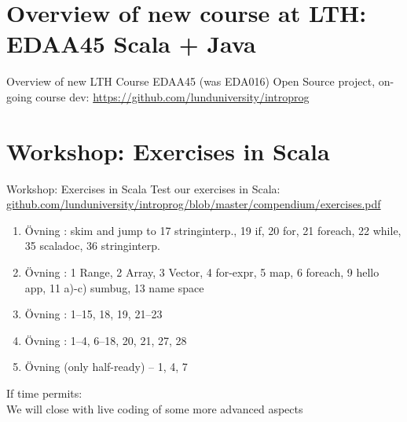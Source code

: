 \documentclass{lecturenotes}
\begin{document}
\section[Overview of new course at LTH]{Overview of new course at LTH: EDAA45 Scala + Java}

\begin{Slide}{Overview of new LTH Course EDAA45 (was EDA016)}
Open Source project, on-going course dev: \url{https://github.com/lunduniversity/introprog} \\ \vspace{1em}

\noindent\resizebox{0.8\columnwidth}{!}{\fontsize{8}{10}\selectfont

}
\end{Slide}


\section[Workshop]{Workshop: Exercises in Scala}

\begin{Slide}{Workshop: Exercises in Scala}
Test our  exercises in Scala:  \\ 
\href{https://github.com/lunduniversity/introprog/blob/master/compendium/exercises.pdf}{\footnotesize github.com/lunduniversity/introprog/blob/master/compendium/exercises.pdf}
 \\ 
\begin{enumerate}\fontsize{8}{10}\selectfont
\item Övning :  skim and jump to 17 stringinterp., 19 if, 20 for, 21 foreach, 22 while, 35 scaladoc, 36 stringinterp.
\item Övning : 1 Range, 2 Array, 3 Vector, 4 for-expr, 5 map, 6 foreach, 9 hello app, 11 a)-c) sumbug, 13 name space
\item Övning : 1--15, 18, 19, 21--23 
\item Övning : 1--4, 6--18, 20,  21, 27, 28
\item Övning  (only half-ready) -- 1, 4, 7  
\end{enumerate}

If time permits: \\ We will close with live coding of some more advanced aspects

\end{Slide}
\end{document}
